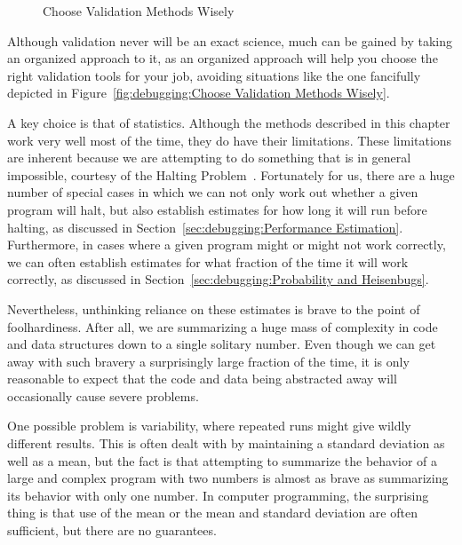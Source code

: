\begin{figure}[tbhp]
\centering
{}
\caption{Choose Validation Methods Wisely}
\end{figure}

Although validation never will be an exact science, much can be gained
by taking an organized approach to it, as an organized approach will
help you choose the right validation tools for your job, avoiding
situations like the one fancifully depicted in
Figure~\ref{fig:debugging:Choose Validation Methods Wisely}.

A key choice is that of statistics.
Although the methods described in this chapter work very well most of
the time, they do have their limitations.
These limitations are inherent because we are attempting to do something
that is in general impossible, courtesy of the
Halting Problem~\cite{AlanMTuring1937HaltingProblem,GeoffreyKPullum2000HaltingProblem}.
Fortunately for us, there are a huge number of special cases in which
we can not only work out whether a given program will halt, but also
establish estimates for how long it will run before halting, as discussed in
Section~\ref{sec:debugging:Performance Estimation}.
Furthermore, in cases where a given program might or might not work
correctly, we can often establish estimates for what fraction of the
time it will work correctly, as discussed in
Section~\ref{sec:debugging:Probability and Heisenbugs}.

Nevertheless, unthinking reliance on these estimates is brave to the
point of foolhardiness.
After all, we are summarizing a huge mass of complexity in code and
data structures down to a single solitary number.
Even though we can get away with such bravery a surprisingly large
fraction of the time, it is only reasonable to expect that the
code and data being abstracted away will occasionally cause severe
problems.

One possible problem is variability, where repeated runs might give
wildly different results.
This is often dealt with by maintaining a standard deviation as well
as a mean, but the fact is that attempting to summarize the behavior
of a large and complex program with two numbers is almost as brave as
summarizing its behavior with only one number.
In computer programming, the surprising thing is that use of the
mean or the mean and standard deviation are often sufficient, but
there are no guarantees.

